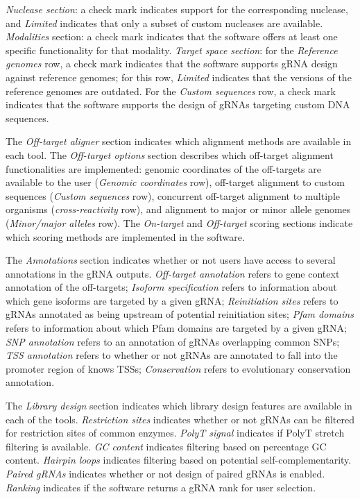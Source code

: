 \documentclass[pdftex,english,10pt]{article}
\begin{document}
{\textit{Nuclease section}: a check mark indicates support for the corresponding nuclease, and \textit{Limited} indicates that only a subset of custom nucleases are available. \textit{Modalities} section:  a check mark indicates that the software offers at least one specific functionality for that modality. \textit{Target space section}: for the \textit{Reference genomes} row, a check mark indicates that the software supports gRNA design against reference genomes; for this row, \textit{Limited} indicates that the versions of the reference genomes are outdated. For the \textit{Custom sequences} row, a check mark indicates that the software supports the design of gRNAs targeting custom DNA sequences. 

The \textit{Off-target aligner} section indicates which alignment methods are available in each tool.
The \textit{Off-target options} section describes which off-target alignment functionalities are implemented: 
genomic coordinates of the off-targets are available to the user (\textit{Genomic coordinates} row), 
off-target alignment to custom sequences (\textit{Custom sequences} row), 
concurrent off-target alignment to multiple organisms (\textit{cross-reactivity} row), 
and alignment to major or minor allele genomes (\textit{Minor/major alleles} row).
The \textit{On-target} and \textit{Off-target} scoring sections indicate which scoring methods are implemented in the software. 



The \textit{Annotations} section indicates whether or not users have access to several annotations in the gRNA outputs. \textit{Off-target annotation} refers to gene context annotation of the off-targets; \textit{Isoform specification} refers to information about which gene isoforms are targeted by a given gRNA; \textit{Reinitiation sites} refers to gRNAs annotated as being upstream of potential reinitiation sites; \textit{Pfam domains} refers to information about which Pfam domains are targeted by a given gRNA; \textit{SNP annotation} refers to an annotation of gRNAs overlapping common SNPs; \textit{TSS annotation} refers to whether or not gRNAs are annotated to fall into the promoter region of knows TSSs; \textit{Conservation} refers to evolutionary conservation annotation. 

The \textit{Library design} section indicates which library design features are available in each of the tools. \textit{Restriction sites} indicates whether or not gRNAs can be filtered for restriction sites of common enzymes. \textit{PolyT signal} indicates if PolyT stretch filtering is available. \textit{GC content} indicates filtering based on percentage GC content. \textit{Hairpin loops} indicates filtering based on potential self-complementarity. \textit{Paired gRNAs} indicates whether or not design of paired gRNAs is enabled. \textit{Ranking} indicates if the software returns a gRNA rank for user selection. 
 




}
\end{document}
